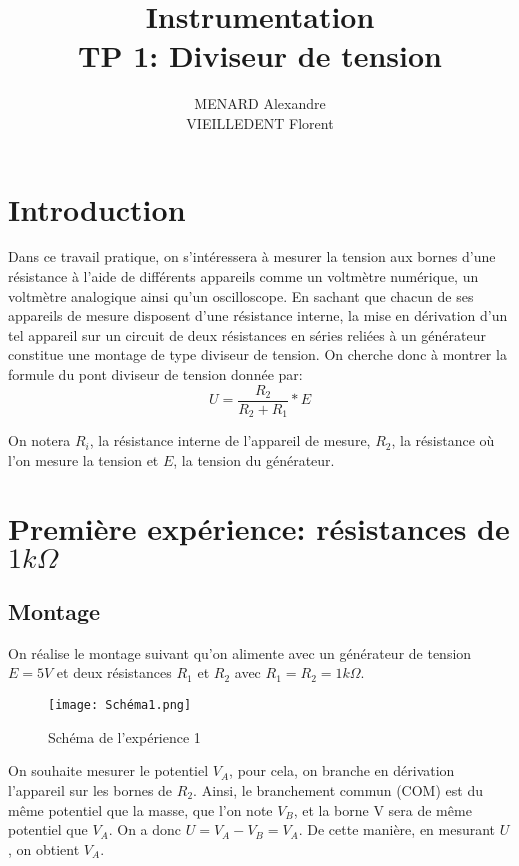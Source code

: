 \documentclass[10pt]{article}
\title{\textbf{Instrumentation} \\ TP 1: Diviseur de tension}
\author{MENARD Alexandre \\ VIEILLEDENT Florent}
\begin{document}
\maketitle

\section*{Introduction}
Dans ce travail pratique, on s'intéressera à mesurer la tension aux bornes d'une résistance à l'aide de différents appareils 
comme un voltmètre numérique, un voltmètre analogique ainsi qu'un oscilloscope. En sachant que chacun de ses appareils de mesure
disposent d'une résistance interne, la mise en dérivation d'un tel appareil sur un circuit de deux résistances en séries reliées à 
un générateur constitue une montage de type diviseur de tension. On cherche donc à montrer la formule du pont diviseur de tension 
donnée par:
\begin{equation}
    U = \frac{R_2}{R_2 + R_1} * E
    \label{eqn:diviseur_tension}
\end{equation}

On notera $R_i$, la résistance interne de l'appareil de mesure, $R_2$, la résistance où l'on mesure la tension et $E$, la tension du 
générateur.

\section{Première expérience: résistances de $1k \Omega$}
\subsection{Montage}

On réalise le montage suivant qu'on alimente avec un générateur de tension $E=5V$ et deux résistances $R_1$ et $R_2$ avec $R_1=R_2=1k\Omega$.

\begin{figure}[!htbp]
    \begin{center}
       \texttt{[image: Schéma1.png]}
        \label{fig:schema1}
        \caption{Schéma de l'expérience 1}
    \end{center}
\end{figure}

\newpage

On souhaite mesurer le potentiel $V_A$, pour cela, on branche en dérivation l'appareil sur les bornes de $R_2$. Ainsi, 
le branchement commun (COM) est du même potentiel que la masse, que l'on note $V_B$, et la borne V sera de même potentiel 
que $V_A$. On a donc $U = V_A - V_B = V_A$. De cette manière, en mesurant $U$, on obtient $V_A$.
\end{document}
